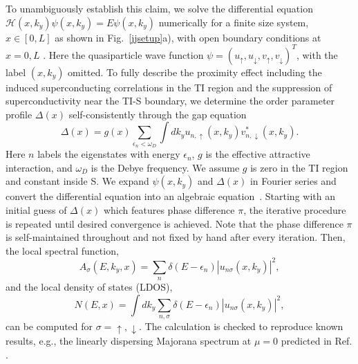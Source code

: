 To unambiguously establish this claim, we solve the differential
equation $\mathcal{H}(x,k_y)\psi(x,k_y)=E \psi(x,k_y)$ numerically 
for a finite size system, $x\in [0,L]$ as shown in Fig.~\ref{jjsetup}a),
with open boundary conditions at $x=0,L$ \cite{footnote1}. Here the quasiparticle wave function
$\psi=\left ( { u} _{\uparrow},  { u}_{\downarrow},  { v}_{\uparrow}, { v}_{\downarrow} \right )^T$,
with the label $(x,k_y)$ omitted.
To fully describe the proximity
effect including the induced superconducting correlations in the TI region
and the suppression of superconductivity near the TI-S boundary, we 
determine the order parameter profile $\Delta(x)$ self-consistently
through the gap equation
\begin{equation}
\Delta(x)= g(x)\sum_{\epsilon_n<\omega_D}\int d k_y u_{n,\uparrow}(x,k_y) v_{n,\downarrow}^\ast(x,k_y).
\end{equation}
Here $n$ labels the eigenstates with energy $\epsilon_n$, $g$ is the effective
attractive interaction, and $\omega_D$ is the Debye frequency. We assume $g$
is zero in the TI region and constant inside S. We expand $\psi(x,k_y)$ and 
$\Delta(x)$ in Fourier series and convert the differential equation into 
an algebraic equation~\cite{halterman_characteristic_2011,PhysRevB.83.184511}. Starting with
an initial guess of $\Delta(x)$ which features phase difference 
$\pi$, the iterative procedure is repeated until desired convergence is achieved.
Note that the phase difference $\pi$ is self-maintained throughout and not fixed by hand after every iteration.
Then, the local spectral function,
\begin{equation}
A_\sigma(E,k_y,x)=\sum_n \delta(E-\epsilon_n)|u_{n\sigma}(x,k_y)|^2,
\end{equation} 
and the local density of states (LDOS),
\begin{equation}
N(E,x)=\int dk_y\sum_{n,\sigma} \delta(E-\epsilon_n)|u_{n\sigma}(x,k_y)|^2,
\end{equation} 
can be computed for $\sigma=\uparrow,\downarrow$. The calculation is checked to
reproduce known results, e.g., the linearly dispersing Majorana spectrum
at $\mu=0$ predicted in Ref. \cite{fu_superconducting_2008}.

